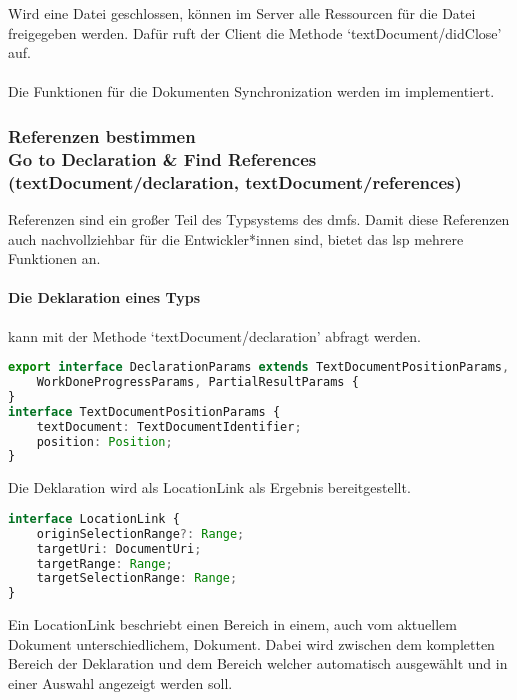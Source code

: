 \documentclass[./einleitung.tex]{subfiles}
\begin{document}
    Wird eine Datei geschlossen, können im Server alle Ressourcen für die Datei freigegeben werden.
    Dafür ruft der Client die Methode `textDocument/didClose' auf.
    \\\\
    Die Funktionen für die Dokumenten Synchronization werden im  implementiert.

    \subsubsection[Referenzen bestimmen]{Referenzen bestimmen\\ {\textnormal{\footnotesize Go to Declaration \& Find References \\ (textDocument/declaration, textDocument/references) \cite{declaration} \cite{references}}}}\label{subsubsec:referenzen}
    Referenzen sind ein großer Teil des Typsystems des \acrshort{dmf}s.
    Damit diese Referenzen auch nachvollziehbar für die Entwickler*innen sind, bietet das \acrshort{lsp} mehrere Funktionen an.
    \paragraph{Die Deklaration eines Typs} kann mit der Methode `textDocument/declaration' abfragt werden.
    \begin{lstlisting}[language=Typescript, title=Definition der Parameter \cite{declaration}, caption=Definition der Deklarations-Parameter \cite{declaration}, label=lst:declarationParams]
export interface DeclarationParams extends TextDocumentPositionParams,
	WorkDoneProgressParams, PartialResultParams {
}
interface TextDocumentPositionParams {
	textDocument: TextDocumentIdentifier;
	position: Position;
}
    \end{lstlisting}
    Die Deklaration wird als LocationLink als Ergebnis bereitgestellt.
    \begin{lstlisting}[language=Typescript, title=Definition des LocationLink \cite{declaration}, label=lst:locationLink]
interface LocationLink {
	originSelectionRange?: Range;
	targetUri: DocumentUri;
	targetRange: Range;
	targetSelectionRange: Range;
}
    \end{lstlisting}
    Ein LocationLink beschriebt einen Bereich in einem, auch vom aktuellem Dokument unterschiedlichem, Dokument.
    Dabei wird zwischen dem kompletten Bereich der Deklaration und dem Bereich welcher automatisch ausgewählt und in einer Auswahl angezeigt werden soll.
\end{document}
